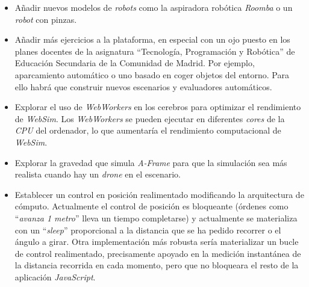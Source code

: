 \begin{itemize}
    \item Añadir nuevos modelos de \textit{robots} como la aspiradora robótica \textit{Roomba} o un \textit{robot} con pinzas. 
    \item Añadir más ejercicios a la plataforma, en especial con un ojo puesto en los planes docentes de la asignatura ``Tecnología, Programación y Robótica'' de Educación Secundaria de la Comunidad de Madrid. Por ejemplo, aparcamiento automático o uno basado en coger objetos del entorno. Para ello habrá que construir nuevos escenarios y evaluadores automáticos. 
    \item Explorar el uso de \textit{WebWorkers} en los cerebros para optimizar el rendimiento de \textit{WebSim}. Los \textit{WebWorkers} se pueden ejecutar en diferentes \textit{cores} de la \textit{CPU} del ordenador, lo que aumentaría el rendimiento computacional de \textit{WebSim}.
    \item Explorar la gravedad que simula \textit{A-Frame} para que la simulación sea más realista cuando hay un \textit{drone} en el escenario. 
    \item Establecer un control en posición realimentado modificando la arquitectura de cómputo. Actualmente el control de posición es bloqueante (órdenes como ``\textit{avanza 1 metro}'' lleva un tiempo completarse) y actualmente se materializa con un ``\textit{sleep}'' proporcional a la distancia que se ha pedido recorrer o el ángulo a girar. Otra implementación más robusta sería materializar un bucle de control realimentado, precisamente apoyado en la medición instantánea de la distancia recorrida en cada momento, pero que no bloqueara el resto de la aplicación \textit{JavaScript}.
\end{itemize}